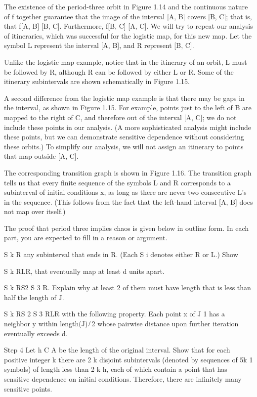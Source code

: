 The existence of the period-three orbit in Figure 1.14 and the continuous nature of f together guarantee 
that the image of the interval [A, B] covers [B, C]; that is, that f[A, B]   [B, C]. Furthermore, f[B, C]  
[A, C]. We will try to repeat our analysis of itineraries, which was successful for the logistic map, for 
this new map. Let the symbol L represent the interval [A, B], and R represent [B, C].

Unlike the logistic map example, notice that in the itinerary of an orbit, L must be followed by R, 
although R can be followed by either L or R. Some of the itinerary subintervals are shown schematically in 
Figure 1.15.

A second difference from the logistic map example is that there may be gaps in the interval, as shown in 
Figure 1.15. For example, points just to the left of B are mapped to the right of C, and therefore out of 
the interval [A, C]; we do not include these points in our analysis. (A more sophisticated analysis might 
include these points, but we can demonstrate sensitive dependence without considering these orbits.) To 
simplify our analysis, we will not assign an itinerary to points that map outside [A, C].

The corresponding transition graph is shown in Figure 1.16. The transition graph tells us that every ﬁnite 
sequence of the symbols L and R corresponds to a subinterval of initial conditions x, as long as there are 
never two consecutive L’s in the sequence. (This follows from the fact that the left-hand interval [A, B] 
does not map over itself.)

The proof that period three implies chaos is given below in outline form. In each part, you are expected to 
ﬁll in a reason or argument.

 S k R any subinterval that ends in R. (Each S i denotes either R or L.) Show

 S k RLR, that eventually map at least d units apart.

 S k RS2  S 3 R. Explain why at least 2 of them must have length that is less than half the length of J.

 S k RS 2 S 3 RLR with the following property. Each point x of J 1 has a neighbor y within length(J) ̸ 2 
whose pairwise distance upon further iteration eventually exceeds d.

Step 4 Let h  C  A be the length of the original interval. Show that for each positive integer k there are 
2 k disjoint subintervals (denoted by sequences of 5k 1 symbols) of length less than 2 k h, each of which 
contain a point that has sensitive dependence on initial conditions. Therefore, there are inﬁnitely many 
sensitive points.

